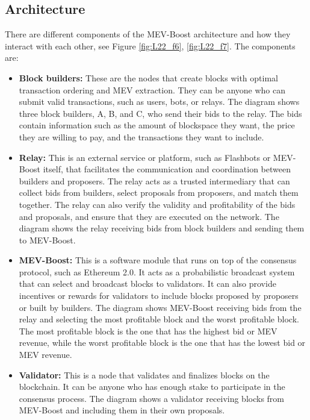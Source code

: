\subsection{Architecture}
There are different components of the MEV-Boost architecture and how they interact with each other, see Figure \ref{fig:L22_f6}, \ref{fig:L22_f7}. The components are:
\begin{itemize}
	\item \textbf{Block builders:} These are the nodes that create blocks with optimal transaction ordering and MEV extraction. They can be anyone who can submit valid transactions, such as users, bots, or relays. The diagram shows three block builders, A, B, and C, who send their bids to the relay. The bids contain information such as the amount of blockspace they want, the price they are willing to pay, and the transactions they want to include.
	\item \textbf{Relay:} This is an external service or platform, such as Flashbots or MEV-Boost itself, that facilitates the communication and coordination between builders and proposers. The relay acts as a trusted intermediary that can collect bids from builders, select proposals from proposers, and match them together. The relay can also verify the validity and profitability of the bids and proposals, and ensure that they are executed on the network. The diagram shows the relay receiving bids from block builders and sending them to MEV-Boost.
	\item \textbf{MEV-Boost:} This is a software module that runs on top of the consensus protocol, such as Ethereum 2.0. It acts as a probabilistic broadcast system that can select and broadcast blocks to validators. It can also provide incentives or rewards for validators to include blocks proposed by proposers or built by builders. The diagram shows MEV-Boost receiving bids from the relay and selecting the most profitable block and the worst profitable block. The most profitable block is the one that has the highest bid or MEV revenue, while the worst profitable block is the one that has the lowest bid or MEV revenue.
	\item \textbf{Validator:} This is a node that validates and finalizes blocks on the blockchain. It can be anyone who has enough stake to participate in the consensus process. The diagram shows a validator receiving blocks from MEV-Boost and including them in their own proposals.
\end{itemize}
